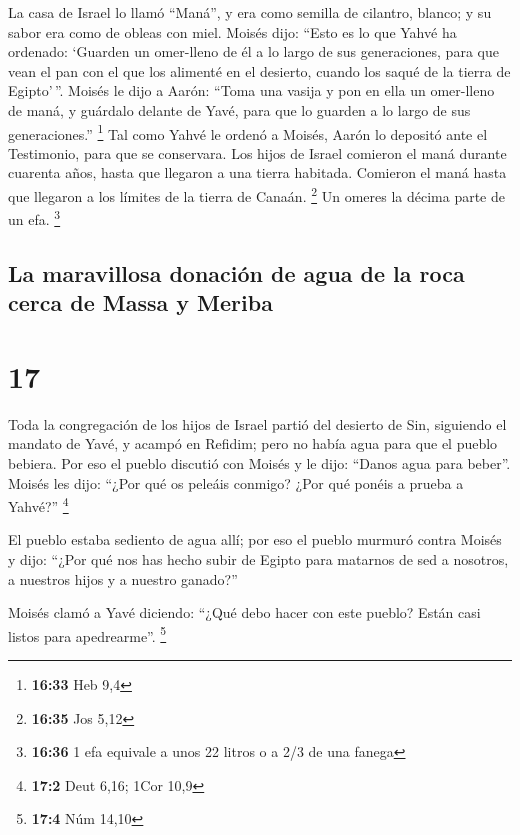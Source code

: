  La casa de Israel lo llamó ``Maná'', y era como semilla
de cilantro, blanco; y su sabor era como de obleas con miel.
 Moisés dijo: ``Esto es lo que Yahvé ha ordenado:
`Guarden un omer-lleno de él a lo largo de sus generaciones, para que
vean el pan con el que los alimenté en el desierto, cuando los saqué de
la tierra de Egipto'\,''.  Moisés le dijo a Aarón: ``Toma
una vasija y pon en ella un omer-lleno de maná, y guárdalo delante de
Yavé, para que lo guarden a lo largo de sus generaciones.'' \footnote{\textbf{16:33}
  Heb 9,4}  Tal como Yahvé le ordenó a Moisés, Aarón lo
depositó ante el Testimonio, para que se conservara.  Los
hijos de Israel comieron el maná durante cuarenta años, hasta que
llegaron a una tierra habitada. Comieron el maná hasta que llegaron a
los límites de la tierra de Canaán. \footnote{\textbf{16:35} Jos 5,12}
 Un omeres la décima parte de un efa. \footnote{\textbf{16:36}
  1 efa equivale a unos 22 litros o a 2/3 de una fanega}

\hypertarget{la-maravillosa-donaciuxf3n-de-agua-de-la-roca-cerca-de-massa-y-meriba}{%
\subsection{La maravillosa donación de agua de la roca cerca de Massa y
Meriba}\label{la-maravillosa-donaciuxf3n-de-agua-de-la-roca-cerca-de-massa-y-meriba}}

\hypertarget{section-16}{%
\section{17}\label{section-16}}

 Toda la congregación de los hijos de Israel partió del
desierto de Sin, siguiendo el mandato de Yavé, y acampó en Refidim; pero
no había agua para que el pueblo bebiera.  Por eso el
pueblo discutió con Moisés y le dijo: ``Danos agua para beber''. Moisés
les dijo: ``¿Por qué os peleáis conmigo? ¿Por qué ponéis a prueba a
Yahvé?'' \footnote{\textbf{17:2} Deut 6,16; 1Cor 10,9}

 El pueblo estaba sediento de agua allí; por eso el pueblo
murmuró contra Moisés y dijo: ``¿Por qué nos has hecho subir de Egipto
para matarnos de sed a nosotros, a nuestros hijos y a nuestro ganado?''

 Moisés clamó a Yavé diciendo: ``¿Qué debo hacer con este
pueblo? Están casi listos para apedrearme''. \footnote{\textbf{17:4} Núm
  14,10}

